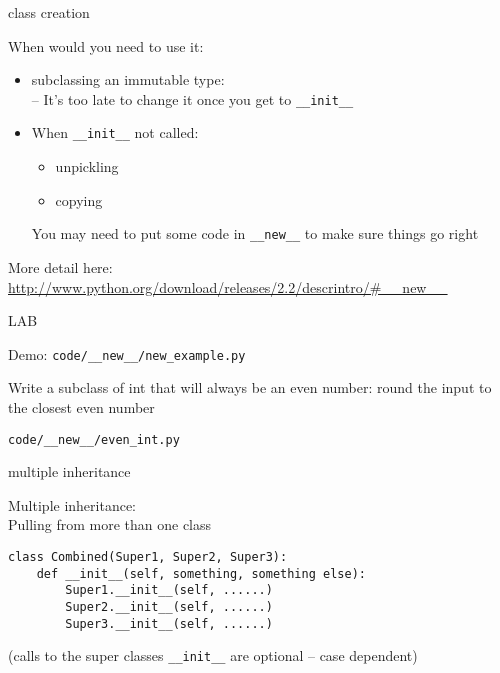 \documentclass{beamer}
\begin{document}
\begin{frame}[fragile]{class creation}

{\Large When would  you need to use it:}

\begin{itemize}
  \item subclassing an immutable type:\\
   -- It's too late to change it once you get to \verb|__init__|

  \item When \verb|__init__| not called:
  \begin{itemize}
    \item unpickling
    \item copying
  \end{itemize}

  {\large You may need to put some code in \verb|__new__| to make sure things go right} 

\end{itemize}

\vfill
{\large More detail here:}
\url{http://www.python.org/download/releases/2.2/descrintro/#__new__}
\end{frame} 

\begin{frame}[fragile]{LAB}

{\large Demo: \verb|code/__new__/new_example.py|}

\vfill
{\Large Write a subclass of int that will always be an even number: round the input to the closest even number}

\vfill
{\large \verb|code/__new__/even_int.py|}

\vfill
\end{frame}


\begin{frame}[fragile]{multiple inheritance}

{\Large Multiple inheritance:\\
\hspace{0.2in} Pulling from more than one class}

\vfill
\begin{verbatim}
class Combined(Super1, Super2, Super3):
    def __init__(self, something, something else):
        Super1.__init__(self, ......)        
        Super2.__init__(self, ......)        
        Super3.__init__(self, ......)        
\end{verbatim}
(calls to the super classes \verb|__init__| are optional -- case dependent)

\end{frame} 
\end{document}
